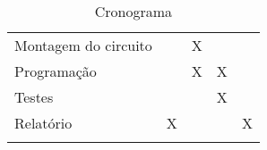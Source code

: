 \begin{longtable}[c]{@{}lllll@{}}
\begin{minipage}[t]{0.39\columnwidth}
Montagem do circuito
\end{minipage} & \begin{minipage}[t]{0.12\columnwidth}\raggedright
\end{minipage} & \begin{minipage}[t]{0.12\columnwidth}\raggedright
X
\end{minipage} & \begin{minipage}[t]{0.12\columnwidth}\raggedright
\end{minipage} & \begin{minipage}[t]{0.12\columnwidth}\raggedright
\end{minipage}
\\\addlinespace
\begin{minipage}[t]{0.39\columnwidth}\raggedright
Programação
\end{minipage} & \begin{minipage}[t]{0.12\columnwidth}\raggedright
\end{minipage} & \begin{minipage}[t]{0.12\columnwidth}\raggedright
X
\end{minipage} & \begin{minipage}[t]{0.12\columnwidth}\raggedright
X
\end{minipage} & \begin{minipage}[t]{0.12\columnwidth}\raggedright
\end{minipage}
\\\addlinespace
\begin{minipage}[t]{0.39\columnwidth}\raggedright
Testes
\end{minipage} & \begin{minipage}[t]{0.12\columnwidth}\raggedright
\end{minipage} & \begin{minipage}[t]{0.12\columnwidth}\raggedright
\end{minipage} & \begin{minipage}[t]{0.12\columnwidth}\raggedright
X
\end{minipage} & \begin{minipage}[t]{0.12\columnwidth}\raggedright
\end{minipage}
\\\addlinespace
\begin{minipage}[t]{0.39\columnwidth}\raggedright
Relatório
\end{minipage} & \begin{minipage}[t]{0.12\columnwidth}\raggedright
X
\end{minipage} & \begin{minipage}[t]{0.12\columnwidth}\raggedright
\end{minipage} & \begin{minipage}[t]{0.12\columnwidth}\raggedright
\end{minipage} & \begin{minipage}[t]{0.12\columnwidth}\raggedright
X
\end{minipage}
\\\addlinespace
\bottomrule
\addlinespace
\caption{Cronograma}
\end{longtable}

